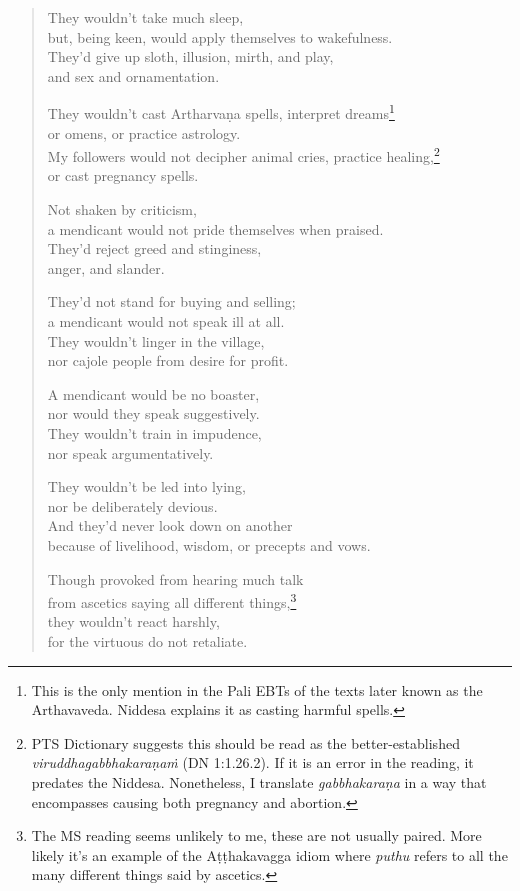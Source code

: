 \documentclass[12pt,openany]{book}%
\begin{document}
\begin{verse}
They wouldn’t take much sleep, \\
but, being keen, would apply themselves to wakefulness. \\
They’d give up sloth, illusion, mirth, and play, \\
and sex and ornamentation. 

They wouldn’t cast \textsanskrit{Artharvaṇa} spells, interpret dreams\footnote{This is the only mention in the Pali EBTs of the texts later known as the Arthavaveda. Niddesa explains it as casting harmful spells. } \\
or omens, or practice astrology. \\
My followers would not decipher animal cries, practice healing,\footnote{PTS Dictionary suggests this should be read as the better-established \textit{\textsanskrit{viruddhagabbhakaraṇaṁ}} (DN 1:1.26.2). If it is an error in the reading, it predates the Niddesa. Nonetheless, I translate \textit{\textsanskrit{gabbhakaraṇa}} in a way that encompasses causing both pregnancy and abortion. } \\
or cast pregnancy spells. 

Not shaken by criticism, \\
a mendicant would not pride themselves when praised. \\
They’d reject greed and stinginess, \\
anger, and slander. 

They’d not stand for buying and selling; \\
a mendicant would not speak ill at all. \\
They wouldn’t linger in the village, \\
nor cajole people from desire for profit. 

A mendicant would be no boaster, \\
nor would they speak suggestively. \\
They wouldn’t train in impudence, \\
nor speak argumentatively. 

They wouldn’t be led into lying, \\
nor be deliberately devious. \\
And they’d never look down on another \\
because of livelihood, wisdom, or precepts and vows. 

Though provoked from hearing much talk \\
from ascetics saying all different things,\footnote{The MS reading seems unlikely to me, these are not usually paired. More likely it’s an example of the \textsanskrit{Aṭṭhakavagga} idiom where \textit{puthu} refers to all the many different things said by ascetics. } \\
they wouldn’t react harshly, \\
for the virtuous do not retaliate. 


\end{verse}
\end{document}
